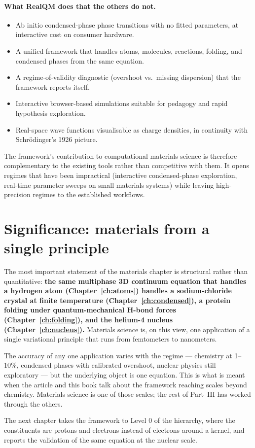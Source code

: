 \paragraph{What RealQM does that the others do not.}
\begin{itemize}
\item Ab initio condensed-phase phase transitions with no fitted parameters, at interactive cost on consumer hardware.
\item A unified framework that handles atoms, molecules, reactions, folding, and condensed phases from the same equation.
\item A regime-of-validity diagnostic (overshoot vs.\ missing dispersion) that the framework reports itself.
\item Interactive browser-based simulations suitable for pedagogy and rapid hypothesis exploration.
\item Real-space wave functions visualisable as charge densities, in continuity with Schr\"odinger's 1926 picture.
\end{itemize}

The framework's contribution to computational materials science is therefore complementary to the existing tools rather than competitive with them. It opens regimes that have been impractical (interactive condensed-phase exploration, real-time parameter sweeps on small materials systems) while leaving high-precision regimes to the established workflows.

\section{Significance: materials from a single principle}\label{sec:material-significance}

The most important statement of the materials chapter is structural rather than quantitative: \textbf{the same multiphase 3D continuum equation that handles a hydrogen atom (Chapter~\ref{ch:atoms}) handles a sodium-chloride crystal at finite temperature (Chapter~\ref{ch:condensed}), a protein folding under quantum-mechanical H-bond forces (Chapter~\ref{ch:folding}), and the helium-4 nucleus (Chapter~\ref{ch:nucleus}).} Materials science is, on this view, one application of a single variational principle that runs from femtometers to nanometers.

The accuracy of any one application varies with the regime --- chemistry at 1--10\%, condensed phases with calibrated overshoot, nuclear physics still exploratory --- but the underlying object is one equation. This is what is meant when the article and this book talk about the framework reaching scales beyond chemistry. Materials science is one of those scales; the rest of Part~III has worked through the others.

The next chapter takes the framework to Level 0 of the hierarchy, where the constituents are protons and electrons instead of electrons-around-a-kernel, and reports the validation of the same equation at the nuclear scale.

